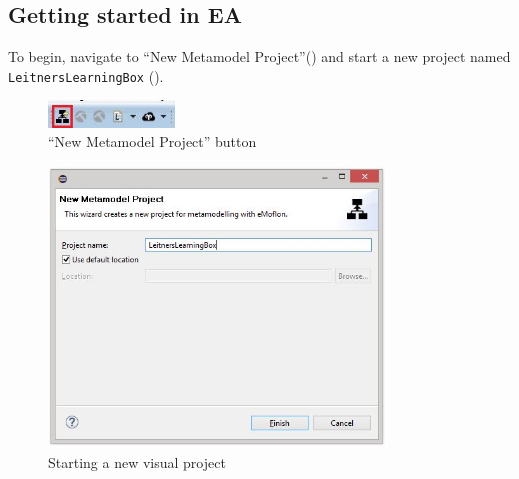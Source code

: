 \newpage
\hypertarget{static:starting vis}{}
\subsection{Getting started in EA}
\genHeader
  
\begin{stepbystep}

\item  To begin, navigate to ``New Metamodel Project''() and start a new project named \texttt{Leit\-ners\-Learn\-ing\-Box} (). 

\vspace{0.5cm}

\begin{figure}[htbp]
	\centering
  \includegraphics[width=0.3\textwidth]{../../org.moflon.doc.handbook.02_leitnersLearningBox/2_staticSemantics/1_newStart/nsVisImages/eclipse_visNewMetamodelButton}
	\caption{``New Metamodel Project'' button}
	\label{eclipse:newVisModelButton}
\end{figure}
\begin{figure}[htbp]
	\centering
  \includegraphics[width=0.8\textwidth]{../../org.moflon.doc.handbook.02_leitnersLearningBox/2_staticSemantics/1_newStart/nsVisImages/eclipse_visNewMetamodelPlain}
	\caption{Starting a new visual project}
	\label{eclipse:newVisModel}
\end{figure}

\vspace{0.5cm}


\end{stepbystep}
